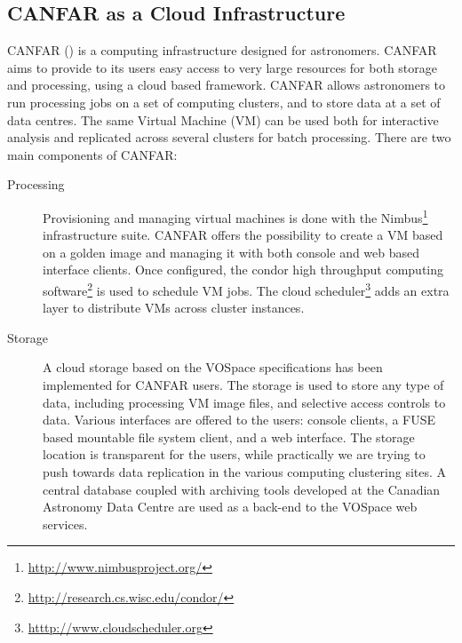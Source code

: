 \subsection{CANFAR as a Cloud Infrastructure}
CANFAR (\cite{canfar}) is a computing infrastructure designed for astronomers. CANFAR aims to provide to its users easy access to very large resources for both storage and processing, using a cloud based framework. CANFAR allows astronomers to run processing jobs on a set of computing clusters, and to store data at a set of data centres. The same Virtual Machine (VM) can be used both for interactive analysis and replicated across several clusters for batch processing. There are two main components of CANFAR:
\begin{description}
\item[Processing] Provisioning and managing virtual machines is done   with the Nimbus\footnote{\url{http://www.nimbusproject.org/}}   infrastructure suite. CANFAR offers the possibility to create a VM based on a golden image and managing it with both console and web based interface clients. Once configured, the condor high throughput computing software\footnote{\url{http://research.cs.wisc.edu/condor/}} is used to schedule VM jobs. The cloud scheduler\footnote{\url{htttp://www.cloudscheduler.org}} adds an extra layer to distribute VMs across cluster instances.
\item[Storage] A cloud storage based on the VOSpace specifications has been implemented for CANFAR users. The storage is used to store any type of data, including processing VM image files, and selective access controls to data. Various interfaces are offered to the users: console clients, a FUSE based mountable file system client, and a web interface. The storage location is transparent for the users, while practically we are trying to push towards data replication in the various computing clustering sites. A central database coupled with archiving tools developed at the Canadian Astronomy Data Centre are used as a back-end to the VOSpace web services.
\end{description}

